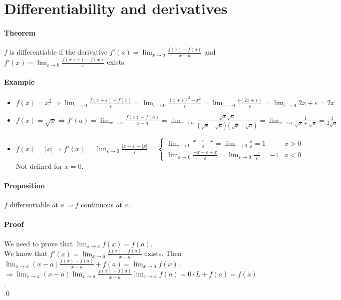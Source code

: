 \documentclass{article}
\newcommand{\DS}{\displaystyle}
\newcommand{\lime}{\lim_{\varepsilon \to 0}}
\newcommand{\limx}[1]{\lim_{x \to #1}}
\newcommand{\Ep}{\varepsilon}
\newcommand{\Proposition}{\paragraph{Proposition}}
\newcommand{\Theorem}{\paragraph{Theorem}}
\newcommand{\Proof}{\paragraph{Proof}}
\newcommand{\Example}{\paragraph{Example}}
\begin{document}
\section{Differentiability and derivatives}

  \Theorem $f$ is differentiable if the derivative $\DS f'(a) = \limx{a}
  \frac{f(x)-f(a)}{x-a}$ and $\DS f'(x) = \lime \frac{f(x+\Ep)-f(x)}{\Ep}$
  exists.

  \Example
  \begin{itemize}
    \item $\DS f(x) = x^2 \Rightarrow \lime \frac{f(x+\Ep)-f(x)}{\Ep} =
    \lime \frac{(x+\Ep)^2 - x^2}{\Ep} = \lime \frac{\Ep (2x + \Ep)}{\Ep} =
    \lime 2x + \Ep = 2x$

    \item $\DS f(x) = \sqrt{x} \Rightarrow f'(a) =
    \limx{a} \frac{f(x)-f(a)}{x-a} =
    \limx{a} \frac{\sqrt{x} \sqrt{a}}{(\sqrt{x}-\sqrt{a})(\sqrt{x}+\sqrt{a})} =
    \limx{a} \frac{1}{\sqrt{x}+\sqrt{a}} = \frac{1}{2\sqrt{a}}$

    \item $\DS f(x) = |x| \Rightarrow f'(x) = \lime \frac{|x+\Ep| - |x|}{\Ep} =
    \begin{cases}
      \lime \frac{x + \Ep - x}{\Ep} = \lime \frac{\Ep}{\Ep} = 1 & x > 0 \\
      \lime \frac{-x - \Ep + x}{\Ep} = \lime \frac{-\Ep}{\Ep} = -1 & x < 0
    \end{cases}$
  \\Not defined for $x = 0$.
  \end{itemize}
  \Proposition $f$ differentiable at $a \Rightarrow f$ continuous at $a$.

  \Proof We need to prove that $\DS \limx{a} f(x) = f(a)$.
\\We know that $f'(a) = \limx{a} \frac{f(x)-f(a)}{x-a}$ exists. Then
  $\DS \limx{a} (x-a) \frac{f(x)-f(a)}{x-a} + f(a) = \limx{a} f(x)$.
\\$\DS \Rightarrow \limx{a}(x-a) \limx{a} \frac{f(x)-f(a)}{x-a} \limx{a}f(a) =
  0 \cdot L + f(a) = f(a)$.
\\\qed


\end{document}
